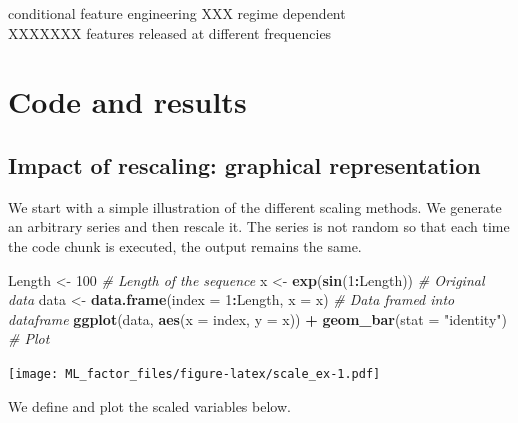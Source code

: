 \documentclass[]{krantz}
\makeatletter
\newenvironment{Shaded}{\begin{snugshade}}{\end{snugshade}}
\newcommand{\CommentTok}[1]{\textcolor[rgb]{0.37,0.37,0.37}{\textit{#1}}}
\newcommand{\DataTypeTok}[1]{\textcolor[rgb]{0.27,0.27,0.27}{#1}}
\newcommand{\DecValTok}[1]{\textcolor[rgb]{0.06,0.06,0.06}{#1}}
\newcommand{\KeywordTok}[1]{\textcolor[rgb]{0.27,0.27,0.27}{\textbf{#1}}}
\newcommand{\NormalTok}[1]{#1}
\newcommand{\OperatorTok}[1]{\textcolor[rgb]{0.43,0.43,0.43}{\textbf{#1}}}
\newcommand{\StringTok}[1]{\textcolor[rgb]{0.5,0.5,0.5}{#1}}
\newenvironment{kframe}{%
\medskip{}
\setlength{\fboxsep}{.8em}
 \def\at@end@of@kframe{}%
 \ifinner\ifhmode%
  \def\at@end@of@kframe{\end{minipage}}%
  \begin{minipage}{\columnwidth}%
 \fi\fi%
 \def\FrameCommand##1{\hskip\@totalleftmargin \hskip-\fboxsep
 \colorbox{shadecolor}{##1}\hskip-\fboxsep
     \hskip-\linewidth \hskip-\@totalleftmargin \hskip\columnwidth}%
 \MakeFramed {\advance\hsize-\width
   \@totalleftmargin\z@ \linewidth\hsize
   \@setminipage}}%
 {\par\unskip\endMakeFramed%
 \at@end@of@kframe}
\renewenvironment{Shaded}{\begin{kframe}}{\end{kframe}}
\theoremstyle{definition}
\theoremstyle{definition}
\theoremstyle{definition}
\theoremstyle{remark}
\makeatother
\begin{document}
conditional feature engineering XXX regime dependent\\
XXXXXXX features released at different frequencies

\hypertarget{code-and-results}{%
\section{Code and results}\label{code-and-results}}

\hypertarget{impact-of-rescaling-graphical-representation}{%
\subsection{Impact of rescaling: graphical
representation}\label{impact-of-rescaling-graphical-representation}}

We start with a simple illustration of the different scaling methods. We
generate an arbitrary series and then rescale it. The series is not
random so that each time the code chunk is executed, the output remains
the same.

\footnotesize

\begin{Shaded}
\begin{Highlighting}[]
\NormalTok{Length <-}\StringTok{ }\DecValTok{100}                                 \CommentTok{# Length of the sequence}
\NormalTok{x <-}\StringTok{ }\KeywordTok{exp}\NormalTok{(}\KeywordTok{sin}\NormalTok{(}\DecValTok{1}\OperatorTok{:}\NormalTok{Length))                       }\CommentTok{# Original data}
\NormalTok{data <-}\StringTok{ }\KeywordTok{data.frame}\NormalTok{(}\DataTypeTok{index =} \DecValTok{1}\OperatorTok{:}\NormalTok{Length, }\DataTypeTok{x =}\NormalTok{ x)   }\CommentTok{# Data framed into dataframe}
\KeywordTok{ggplot}\NormalTok{(data, }\KeywordTok{aes}\NormalTok{(}\DataTypeTok{x =}\NormalTok{ index, }\DataTypeTok{y =}\NormalTok{ x)) }\OperatorTok{+}\StringTok{ }\KeywordTok{geom_bar}\NormalTok{(}\DataTypeTok{stat =} \StringTok{"identity"}\NormalTok{) }\CommentTok{# Plot}
\end{Highlighting}
\end{Shaded}

\texttt{[image: ML\_factor\_files/figure-latex/scale\_ex-1.pdf]}

\normalsize

We define and plot the scaled variables below.

\footnotesize
\end{document}
